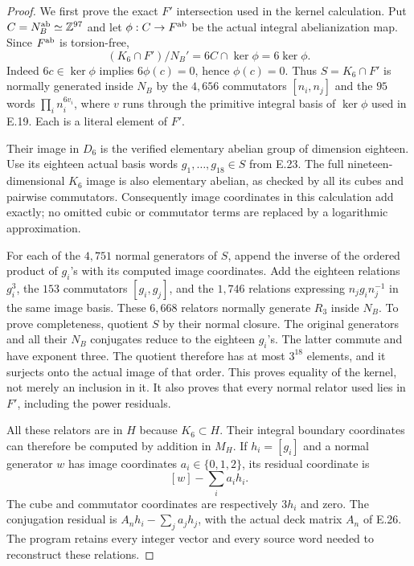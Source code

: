 \begin{proof}
We first prove the exact $F'$ intersection used in the
kernel calculation.  Put $C=N_B^{\rm ab}\simeq\mathbb Z^{97}$
and let $\phi:C\to F^{\rm ab}$ be the actual integral
abelianization map.  Since $F^{\rm ab}$ is torsion-free,
\[
 (K_6\cap F')/N_B'=6C\cap\ker\phi=6\ker\phi.
 \tag{E.31.6}
\]
Indeed $6c\in\ker\phi$ implies $6\phi(c)=0$, hence
$\phi(c)=0$.  Thus $S=K_6\cap F'$ is normally generated
inside $N_B$ by the $4,656$ commutators $[n_i,n_j]$
and the $95$ words
$\prod_i n_i^{6v_i}$, where $v$ runs through the
primitive integral basis of $\ker\phi$ used in E.19.
Each is a literal element of $F'$.

Their image in $D_6$ is the verified elementary abelian
group of dimension eighteen.  Use its eighteen actual
basis words $g_1,\ldots,g_{18}\in S$ from E.23.
The full nineteen-dimensional $K_6$ image is also
elementary abelian, as checked by all its cubes and
pairwise commutators.  Consequently image coordinates
in this calculation add exactly; no omitted cubic or
commutator terms are replaced by a logarithmic
approximation.

For each of the $4,751$ normal generators of $S$,
append the inverse of the ordered product of $g_i$'s
with its computed image coordinates.  Add the eighteen
relations $g_i^3$, the $153$ commutators
$[g_i,g_j]$, and the $1,746$ relations expressing
$n_jg_i n_j^{-1}$ in the same image basis.
These $6,668$ relators normally generate $R_3$ inside
$N_B$.  To prove completeness, quotient $S$ by their
normal closure.  The original generators and all their
$N_B$ conjugates reduce to the eighteen $g_i$'s.
The latter commute and have exponent three.
The quotient therefore has at most $3^{18}$ elements,
and it surjects onto the actual image of that order.
This proves equality of the kernel, not merely an
inclusion in it.  It also proves that every normal
relator used lies in $F'$, including the power
residuals.

All these relators are in $H$ because $K_6\subset H$.
Their integral boundary coordinates can therefore be
computed by addition in $M_H$.  If $h_i=[g_i]$ and a
normal generator $w$ has image coordinates
$a_i\in\{0,1,2\}$, its residual coordinate is
\[
                       [w]-\sum_i a_i h_i .
 \tag{E.31.7}
\]
The cube and commutator coordinates are respectively
$3h_i$ and zero.  The conjugation residual is
$A_nh_i-\sum_j a_jh_j$, with the actual deck matrix
$A_n$ of E.26.  The program retains every integer
vector and every source word needed to reconstruct
these relations.


\end{proof}
